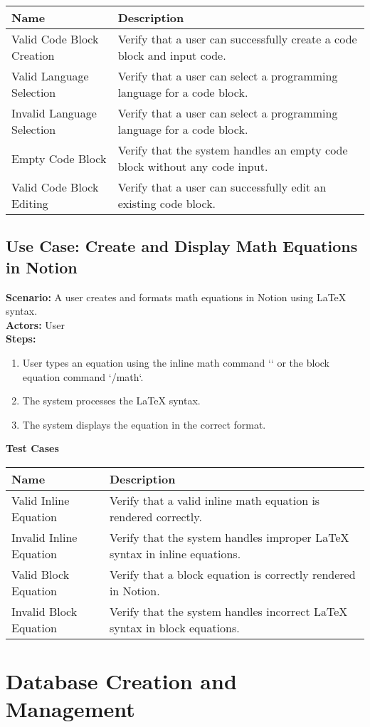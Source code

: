 \documentclass{article}
\begin{document}
            \begin{longtable}{|p{}|p{}|}
            \hline
            \textbf{Name} & \textbf{Description} \\
            \hline
            Valid Code Block Creation & Verify that a user can successfully create a code block and input code. \\
\hline
Valid Language Selection & Verify that a user can select a programming language for a code block. \\
\hline
Invalid Language Selection & Verify that a user can select a programming language for a code block. \\
\hline
Empty Code Block & Verify that the system handles an empty code block without any code input. \\
\hline
Valid Code Block Editing & Verify that a user can successfully edit an existing code block. \\
\hline
\end{longtable}\subsection{\textbf{Use Case: Create and Display Math Equations in Notion}}
\textbf{Scenario:} A user creates and formats math equations in Notion using LaTeX syntax.\\
\textbf{Actors:} User\\
\textbf{Steps:}
\begin{enumerate}
\item User types an equation using the inline math command `$$` or the block equation command `/math`.
\item The system processes the LaTeX syntax.
\item The system displays the equation in the correct format.
\end{enumerate}
\textbf{Test Cases}

            \begin{longtable}{|p{}|p{}|}
            \hline
            \textbf{Name} & \textbf{Description} \\
            \hline
            Valid Inline Equation & Verify that a valid inline math equation is rendered correctly. \\
\hline
Invalid Inline Equation & Verify that the system handles improper LaTeX syntax in inline equations. \\
\hline
Valid Block Equation & Verify that a block equation is correctly rendered in Notion. \\
\hline
Invalid Block Equation & Verify that the system handles incorrect LaTeX syntax in block equations. \\
\hline
\end{longtable}\section{\textbf{Database Creation and Management}}
\end{document}
